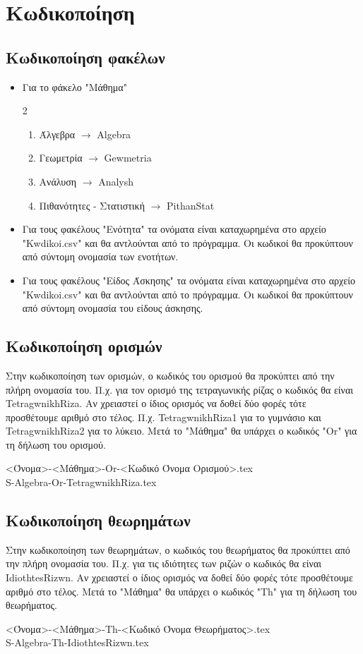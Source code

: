 \documentclass[11pt,a4paper]{book}
\newcommand{\xr}[1]{\textcolor{red!80!black}{#1}}
\begin{document}
\section{Κωδικοποίηση}
\subsection{Κωδικοποίηση φακέλων}\label{par:KwdFakelwn}
\begin{itemize}[leftmargin=4mm,itemsep=0mm]
\item Για το φάκελο "Μάθημα"
\begin{multicols}{2}
\begin{enumerate}
\item Άλγεβρα $ \to $ \xr{Algebra}
\item Γεωμετρία $ \to $ \xr{Gewmetria}
\item Ανάλυση $ \to $ \xr{Analysh}
\item Πιθανότητες - Στατιστική $ \to $ \xr{PithanStat}
\end{enumerate}
\end{multicols}
\item Για τους φακέλους "Ενότητα" τα ονόματα είναι καταχωρημένα στο αρχείο "\xr{Kwdikoi.csv}" και θα αντλούνται από το πρόγραμμα. Οι κωδικοί θα προκύπτουν από σύντομη ονομασία των ενοτήτων.
\item Για τους φακέλους "Είδος Άσκησης" τα ονόματα είναι καταχωρημένα στο αρχείο "\xr{Kwdikoi.csv}" και θα αντλούνται από το πρόγραμμα. Οι κωδικοί θα προκύπτουν από σύντομη ονομασία του είδους άσκησης.
\end{itemize}
\subsection{Κωδικοποίηση ορισμών}
Στην κωδικοποίηση των ορισμών, ο κωδικός του ορισμού θα προκύπτει από την πλήρη ονομασία του. Π.χ. για τον ορισμό της τετραγωνικής ρίζας ο κωδικός θα είναι \xr{TetragwnikhRiza}. Αν χρειαστεί ο ίδιος ορισμός να δοθεί δύο φορές τότε προσθέτουμε αριθμό στο τέλος. Π.χ. \xr{TetragwnikhRiza1} για το γυμνάσιο και \xr{TetragwnikhRiza2} για το λύκειο. Μετά το "Μάθημα" θα υπάρχει ο κωδικός "\xr{Or}" για τη δήλωση του ορισμού.
\begin{center}
<Όνομα>-<Μάθημα>-Or-<Κωδικό Όνομα Ορισμού>.tex\\
\xr{S}-Algebra-\xr{Or}-TetragwnikhRiza.tex
\end{center}
\subsection{Κωδικοποίηση θεωρημάτων}
Στην κωδικοποίηση των θεωρημάτων, ο κωδικός του θεωρήματος θα προκύπτει από την πλήρη ονομασία του. Π.χ. για τις ιδιότητες των ριζών ο κωδικός θα είναι \xr{IdiothtesRizwn}. Αν χρειαστεί ο ίδιος ορισμός να δοθεί δύο φορές τότε προσθέτουμε αριθμό στο τέλος. Μετά το "Μάθημα" θα υπάρχει ο κωδικός "\xr{Th}" για τη δήλωση του θεωρήματος.
\begin{center}
<Όνομα>-<Μάθημα>-Th-<Κωδικό Όνομα Θεωρήματος>.tex\\
\xr{S}-Algebra-\xr{Th}-IdiothtesRizwn.tex
\end{center}
\end{document}
